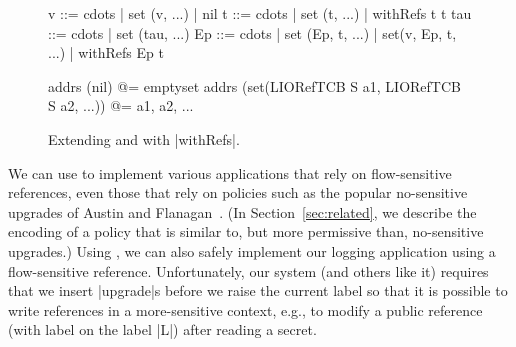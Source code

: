 \begin{figure} %
\small
\begin{code}
v    ::= cdots  | set (v, ...) | nil
t    ::= cdots  | set (t, ...) | withRefs t t
tau  ::= cdots  | set (tau, ...)
Ep   ::= cdots  | set (Ep, t, ...) | set(v, Ep, t, ...) | withRefs Ep t 

addrs (nil)                                       @= emptyset
addrs (set(LIORefTCB S a1, LIORefTCB S a2, ...))  @= {a1, a2, ...}
\end{code}
\caption{Extending \liofs{} and \lioafs{} with |withRefs|.\label{fig:sos:withRefs}}
\end{figure}

We can use \liofs{} to implement various applications that rely on
flow-sensitive references, even those that rely on policies such as the
popular no-sensitive upgrades of Austin and Flanagan~\cite{Austin:Flanagan:PLAS09}.
%
(In Section~\ref{sec:related}, we describe the encoding of a policy that is
similar to, but more permissive than, no-sensitive upgrades.)
%
Using \liofs{}, we can also safely implement our logging application using a
flow-sensitive reference.
%
Unfortunately, our system (and others like it) requires that we insert
|upgrade|s before we raise the current label so that it is possible to 
write references in a more-sensitive context, e.g., to modify a public reference
(with label on the label |L|) after reading a secret. 

